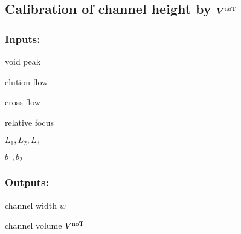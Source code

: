 \begin{comment}
  \State \Return \CFone
\end{algorithmic}
\clearpage
\end{comment}
\clearpage
\subsection*{Calibration of channel height by $\bm{V^\text{noT}}$}
\subsubsection*{Inputs:}
\label{sec:CalibVhyd}
\begin{multicols}{3}
  \begin{packed_item}
    \item void peak \tvoid
    \item elution flow \Ve
    \item cross flow \Vc
    \item relative focus \zP
    \item $L_1, L_2, L_3$
    \item $b_1, b_2$
  \end{packed_item}
\end{multicols}

\subsubsection*{Outputs:}
\begin{multicols}{3}
  \begin{packed_item}
    \item channel width $w$
    \item channel volume $V^\text{noT}$
  \end{packed_item}
\end{multicols}


